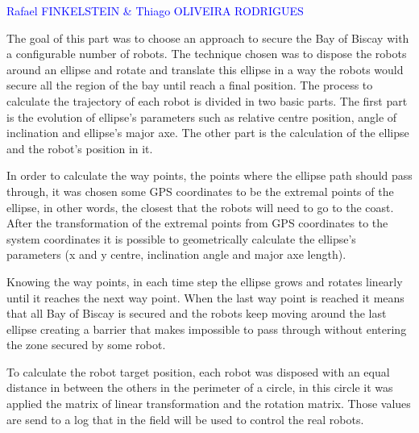 \textcolor{blue} {Rafael FINKELSTEIN \& Thiago OLIVEIRA RODRIGUES}


The goal of this part was to choose an approach to secure the Bay of Biscay with a configurable number of robots. The technique chosen was to dispose the robots around an ellipse and rotate and translate this ellipse in a way the robots would secure all the region of the bay until reach a final position.  The process to calculate the trajectory of each robot is divided in two basic parts. The first part is the evolution of ellipse’s parameters such as relative centre position, angle of inclination and ellipse’s major axe. The other part is the calculation of the ellipse and the robot’s position in it.
\vspace*{0.5cm}


In order to calculate the way points, the points where the ellipse path should pass through, it was chosen some GPS coordinates to be the extremal points of the ellipse, in other words, the closest that the robots will need to go to the coast. After the transformation of the extremal points from GPS coordinates to the system coordinates it is possible to geometrically calculate the ellipse’s parameters (x and y centre, inclination angle and major axe length).
\vspace*{0.5cm}


Knowing the way points, in each time step the ellipse grows and rotates linearly until it reaches the next way point. When the last way point is reached it means that all Bay of Biscay is secured and the robots keep moving around the last ellipse creating a barrier that makes impossible to pass through without entering the zone secured by some robot.
\vspace*{0.5cm}

To calculate the robot target position, each robot was disposed with an equal distance in between the others in the perimeter of a circle, in this circle it was applied the matrix of linear transformation and the rotation matrix. Those values are send to a log that in the field will be used to control the real robots.
\vspace*{0.5cm}


